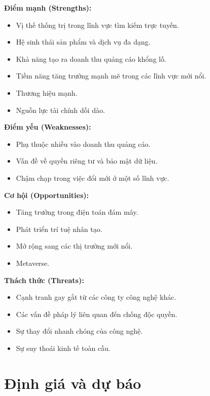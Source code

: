 \documentclass[12pt]{article}
\begin{document}
\textbf{Điểm mạnh (Strengths):}

\begin{itemize}
    \item Vị thế thống trị trong lĩnh vực tìm kiếm trực tuyến.
    \item Hệ sinh thái sản phẩm và dịch vụ đa dạng.
    \item Khả năng tạo ra doanh thu quảng cáo khổng lồ.
    \item Tiềm năng tăng trưởng mạnh mẽ trong các lĩnh vực mới nổi.
    \item Thương hiệu mạnh.
    \item Nguồn lực tài chính dồi dào.
\end{itemize}

\textbf{Điểm yếu (Weaknesses):}

\begin{itemize}
    \item Phụ thuộc nhiều vào doanh thu quảng cáo.
    \item Vấn đề về quyền riêng tư và bảo mật dữ liệu.
    \item Chậm chạp trong việc đổi mới ở một số lĩnh vực.
\end{itemize}

\textbf{Cơ hội (Opportunities):}

\begin{itemize}
    \item Tăng trưởng trong điện toán đám mây.
    \item Phát triển trí tuệ nhân tạo.
    \item Mở rộng sang các thị trường mới nổi.
    \item Metaverse.
\end{itemize}

\textbf{Thách thức (Threats):}

\begin{itemize}
    \item Cạnh tranh gay gắt từ các công ty công nghệ khác.
    \item Các vấn đề pháp lý liên quan đến chống độc quyền.
    \item Sự thay đổi nhanh chóng của công nghệ.
    \item Sự suy thoái kinh tế toàn cầu.
\end{itemize}

\section{Định giá và dự báo}
\end{document}
